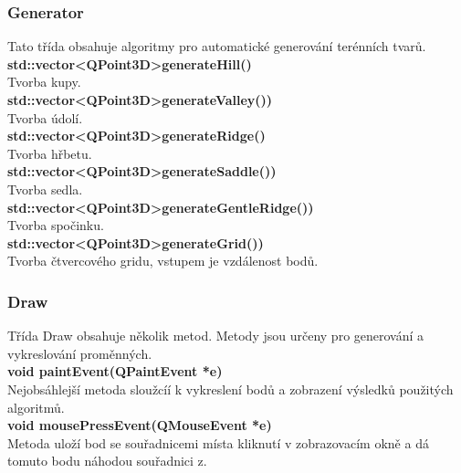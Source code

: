 \documentclass[a4paper,11pt,twoside]{article}
\begin{document}
\newpage
\vspace*{-1cm}
\subsubsection{Generator}
Tato třída obsahuje algoritmy pro automatické generování terénních tvarů.\\

\noindent\textbf{std::vector\textless QPoint3D\textgreater generateHill()}\\
Tvorba kupy.\\

\noindent\textbf{std::vector\textless QPoint3D\textgreater generateValley())}\\
Tvorba údolí.\\

\noindent\textbf{std::vector\textless QPoint3D\textgreater generateRidge()}\\
Tvorba hřbetu.\\

\noindent\textbf{std::vector\textless QPoint3D\textgreater generateSaddle())}\\
Tvorba sedla.\\

\noindent\textbf{std::vector\textless QPoint3D\textgreater generateGentleRidge())}\\
Tvorba spočinku.\\

\noindent\textbf{std::vector\textless QPoint3D\textgreater generateGrid())}\\
Tvorba čtvercového gridu, vstupem je vzdálenost bodů.\\

\subsubsection{Draw}

Třída Draw obsahuje několik metod. Metody jsou určeny pro generování a vykreslování proměnných.\\

\noindent\textbf{void paintEvent(QPaintEvent *e)}\\
Nejobsáhlejší metoda sloužcíí k vykreslení bodů a zobrazení výsledků použitých algoritmů.\\

\noindent\textbf{void mousePressEvent(QMouseEvent *e)}\\
Metoda uloží bod se souřadnicemi místa kliknutí v zobrazovacím okně a dá tomuto bodu náhodou souřadnici z.\\
\end{document}
